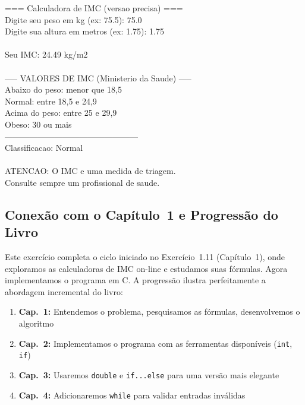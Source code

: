 \documentclass[12pt,a4paper]{article}
\begin{document}
\begin{respostabox}
\begin{saida}
=== Calculadora de IMC (versao precisa) ===\\
Digite seu peso em kg (ex: 75.5): 75.0\\
Digite sua altura em metros (ex: 1.75): 1.75\\
\\
Seu IMC: 24.49 kg/m2\\
\\
----- VALORES DE IMC (Ministerio da Saude) -----\\
Abaixo do peso:   menor que 18,5\\
Normal:           entre 18,5 e 24,9\\
Acima do peso:    entre 25 e 29,9\\
Obeso:            30 ou mais\\
------------------------------------------------\\
Classificacao: Normal\\
\\
ATENCAO: O IMC e uma medida de triagem.\\
Consulte sempre um profissional de saude.
\end{saida}
\end{respostabox}

\subsection{Conexão com o Capítulo~1 e Progressão do Livro}

Este exercício completa o ciclo iniciado no Exercício~1.11 (Capítulo~1), onde
exploramos as calculadoras de IMC on-line e estudamos suas fórmulas. Agora implementamos
o programa em C. A progressão ilustra perfeitamente a abordagem incremental do livro:
\begin{enumerate}
  \item \textbf{Cap.~1:} Entendemos o problema, pesquisamos as fórmulas, desenvolvemos o algoritmo
  \item \textbf{Cap.~2:} Implementamos o programa com as ferramentas disponíveis (\texttt{int}, \texttt{if})
  \item \textbf{Cap.~3:} Usaremos \texttt{double} e \texttt{if...else} para uma versão mais elegante
  \item \textbf{Cap.~4:} Adicionaremos \texttt{while} para validar entradas inválidas
\end{enumerate}

\newpage

\end{document}
